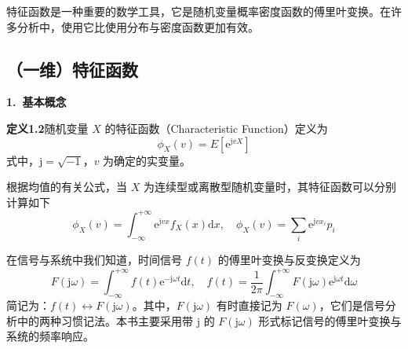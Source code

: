 \documentclass[11pt,openany,UTF8]{ctexbook}
\newcommand{\dif}{\mathrm{d}}                      %
\newcommand{\eu}{\mathrm{e}}                       %
\newcommand{\ju}{\mathrm{j}}                       %
\newcommand{\bhead}[1]{\par\medskip\noindent\textbf{#1}\par\smallskip}
\newcommand{\thm}[1]{\par\medskip\noindent\textbf{#1}\quad}
\begin{document}
特征函数是一种重要的数学工具\nobreak，它是随机变量概率密度函数的傅里叶变换\nobreak。在许多分析中\nobreak，使用它比使用分布与密度函数更加有效\nobreak。

\subsection{（一维\nobreak）特征函数}

\bhead{1.\ 基本概念}

\thm{定义1.2}\quad 随机变量 $X$ 的特征函数（Characteristic Function\nobreak）定义为
\begin{equation}
\phi_X(v)=E[\eu^{\ju vX}]
\label{eq:1.59}
\end{equation}
式中\nobreak，$\ju=\sqrt{-1}$\nobreak，$v$ 为确定的实变量\nobreak。



根据均值的有关公式\nobreak，当 $X$ 为连续型或离散型随机变量时\nobreak，其特征函数可以分别计算如下
\begin{equation}
\phi_X(v)=\int_{-\infty}^{+\infty}\eu^{\ju vx}f_X(x)\dif x,\quad
\phi_X(v)=\sum_i \eu^{\ju vx_i}p_i
\label{eq:1.60}
\end{equation}

在信号与系统中我们知道\nobreak，时间信号 $f(t)$ 的傅里叶变换与反变换定义为
\begin{equation}
F(\ju\omega)=\int_{-\infty}^{+\infty}f(t)\eu^{-\ju\omega t}\dif t,\quad
f(t)=\frac{1}{2\pi}\int_{-\infty}^{+\infty}F(\ju\omega)\eu^{\ju\omega t}\dif\omega
\label{eq:1.61}
\end{equation}
简记为\nobreak：$f(t)\leftrightarrow F(\ju\omega)$\nobreak。其中\nobreak，$F(\ju\omega)$ 有时直接记为 $F(\omega)$\nobreak，它们是信号分析中的两种习惯记法\nobreak。本书主要采用带 $\ju$ 的 $F(\ju\omega)$ 形式标记信号的傅里叶变换与系统的频率响应\nobreak。
\end{document}
